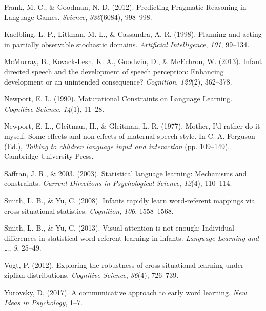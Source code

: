 \documentclass[10pt, letterpaper]{article}
\begin{document}
\hypertarget{ref-frank2012}{}
Frank, M. C., \& Goodman, N. D. (2012). Predicting Pragmatic Reasoning
in Language Games. \emph{Science}, \emph{336}(6084), 998--998.

\hypertarget{ref-kaelbling1998}{}
Kaelbling, L. P., Littman, M. L., \& Cassandra, A. R. (1998). Planning
and acting in partially observable stochastic domains. \emph{Artificial
Intelligence}, \emph{101}, 99--134.

\hypertarget{ref-mcmurray2013}{}
McMurray, B., Kovack-Lesh, K. A., Goodwin, D., \& McEchron, W. (2013).
Infant directed speech and the development of speech perception:
Enhancing development or an unintended consequence? \emph{Cognition},
\emph{129}(2), 362--378.

\hypertarget{ref-newport1990}{}
Newport, E. L. (1990). Maturational Constraints on Language Learning.
\emph{Cognitive Science}, \emph{14}(1), 11--28.

\hypertarget{ref-newport1977}{}
Newport, E. L., Gleitman, H., \& Gleitman, L. R. (1977). Mother, I'd
rather do it myself: Some effects and non-effects of maternal speech
style. In C. A. Ferguson (Ed.), \emph{Talking to children language input
and interaction} (pp. 109--149). Cambridge University Press.

\hypertarget{ref-saffran2003}{}
Saffran, J. R., \& 2003. (2003). Statistical language learning:
Mechanisms and constraints. \emph{Current Directions in Psychological
Science}, \emph{12}(4), 110--114.

\hypertarget{ref-smith2008}{}
Smith, L. B., \& Yu, C. (2008). Infants rapidly learn word-referent
mappings via cross-situational statistics. \emph{Cognition}, \emph{106},
1558--1568.

\hypertarget{ref-smith2013}{}
Smith, L. B., \& Yu, C. (2013). Visual attention is not enough:
Individual differences in statistical word-referent learning in infants.
\emph{Language Learning and \ldots{}}, \emph{9}, 25--49.

\hypertarget{ref-vogt2012}{}
Vogt, P. (2012). Exploring the robustness of cross-situational learning
under zipfian distributions. \emph{Cognitive Science}, \emph{36}(4),
726--739.

\hypertarget{ref-yurovsky2017}{}
Yurovsky, D. (2017). A communicative approach to early word learning.
\emph{New Ideas in Psychology}, 1--7.


\end{document}
